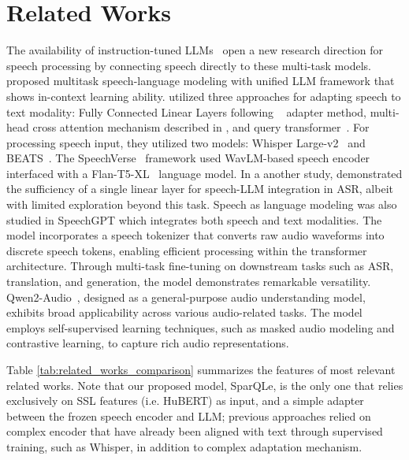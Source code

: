 \section{Related Works}
The availability  of instruction-tuned LLMs~\cite{llama3modelcard, touvron2023llama, jiang2023mistral} open a new research direction for speech processing by connecting speech directly to these multi-task models. \citet{chen2023salm} proposed multitask speech-language modeling with unified LLM framework that shows in-context learning ability. \citet{yu2023connecting} utilized three approaches for adapting speech to text modality: Fully Connected Linear Layers following ~\cite{houlsby2019parameter} adapter method, multi-head cross attention mechanism described in \cite{vaswani2017attention}, and query transformer~\cite{li2023blip}. For processing speech input, they utilized two models: Whisper Large-v2~\cite{radford2023robust} and BEATS~\cite{pmlr-v202-chen23ag}. The SpeechVerse~\cite{das2024speechverse} framework used WavLM-based speech encoder interfaced with a Flan-T5-XL~\cite{JMLR:v25:23-0870} language model.
In a another study, \citet{ma2024embarrassingly} demonstrated the sufficiency of a single linear layer for speech-LLM integration in ASR, albeit with limited exploration beyond this task.
Speech as language modeling was also studied in SpeechGPT \citep{zhang2023speechgpt} which integrates both speech and text modalities. The model incorporates a speech tokenizer that converts raw audio waveforms into discrete speech tokens, enabling efficient processing within the transformer architecture. Through multi-task fine-tuning on downstream tasks such as ASR, translation, and generation, the model demonstrates remarkable versatility. Qwen2-Audio~\cite{Qwen2-Audio}, designed as a general-purpose audio understanding model, exhibits broad applicability across various audio-related tasks. The model employs self-supervised learning techniques, such as masked audio modeling and contrastive learning, to capture rich audio representations.

Table \ref{tab:related_works_comparison} summarizes the features of most relevant related works. Note that our proposed model, SparQLe, is the only one that relies exclusively on SSL features (i.e. HuBERT) as input, and a simple adapter between the frozen speech encoder and LLM; previous approaches relied on complex encoder that have already been aligned with text through supervised training, such as Whisper, in addition to complex adaptation mechanism.